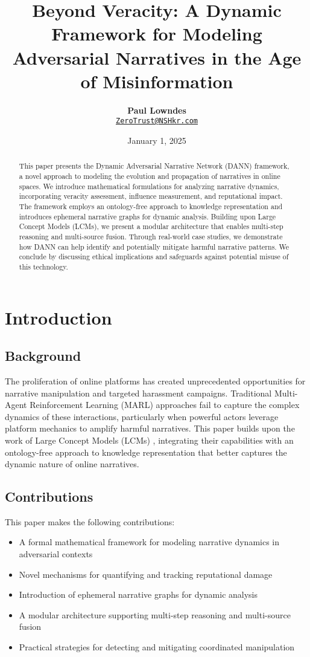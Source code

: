 \documentclass[12pt, a4paper]{article}
\title{\vspace{-2cm}\textbf{Beyond Veracity: A Dynamic Framework for Modeling Adversarial Narratives in the Age of Misinformation}}
\author{\textbf{Paul Lowndes} \\ \href{mailto:ZeroTrust@NSHkr.com}{\texttt{ZeroTrust@NSHkr.com}}}
\date{\small January 1, 2025}
\begin{document}
\maketitle
\vspace{-1.5em}

\begin{abstract}
This paper presents the Dynamic Adversarial Narrative Network (DANN) framework, a novel approach to modeling the evolution and propagation of narratives in online spaces. We introduce mathematical formulations for analyzing narrative dynamics, incorporating veracity assessment, influence measurement, and reputational impact. The framework employs an ontology-free approach to knowledge representation and introduces ephemeral narrative graphs for dynamic analysis. Building upon Large Concept Models (LCMs), we present a modular architecture that enables multi-step reasoning and multi-source fusion. Through real-world case studies, we demonstrate how DANN can help identify and potentially mitigate harmful narrative patterns. We conclude by discussing ethical implications and safeguards against potential misuse of this technology.
\end{abstract}

\section{Introduction}
\subsection{Background}
The proliferation of online platforms has created unprecedented opportunities for narrative manipulation and targeted harassment campaigns. Traditional Multi-Agent Reinforcement Learning (MARL) approaches fail to capture the complex dynamics of these interactions, particularly when powerful actors leverage platform mechanics to amplify harmful narratives. This paper builds upon the work of Large Concept Models (LCMs) \cite{lcm_paper}, integrating their capabilities with an ontology-free approach to knowledge representation that better captures the dynamic nature of online narratives.

\subsection{Contributions}
This paper makes the following contributions:
\begin{itemize}
    \item A formal mathematical framework for modeling narrative dynamics in adversarial contexts
    \item Novel mechanisms for quantifying and tracking reputational damage
    \item Introduction of ephemeral narrative graphs for dynamic analysis
    \item A modular architecture supporting multi-step reasoning and multi-source fusion
    \item Practical strategies for detecting and mitigating coordinated manipulation
\end{itemize}
\end{document}
